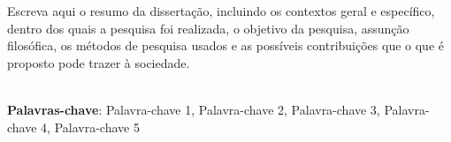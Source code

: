 \begin{thesisresumo}
Escreva aqui o resumo da disserta\c{c}\~ao, incluindo os contextos geral e espec\'ifico, dentro dos quais a pesquisa foi realizada, o objetivo da pesquisa, assun\c{c}\~ao filos\'ofica, os m\'etodos de pesquisa usados e as poss\'iveis contribui\c{c}\~oes que o que \'e proposto pode trazer \`a sociedade.

\ \\


\textbf{Palavras-chave}: Palavra-chave 1, Palavra-chave 2, Palavra-chave 3, Palavra-chave 4, Palavra-chave 5

\end{thesisresumo}
